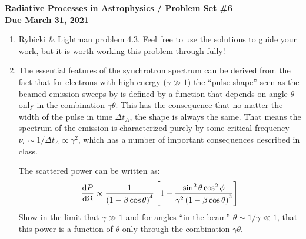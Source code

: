 \documentclass[11pt, preprint]{article}
\begin{document}
\begin{center}
  {\bf Radiative Processes in Astrophysics / Problem Set \#6 \\
    Due March 31, 2021}
\end{center}

\begin{enumerate}
\item Rybicki \& Lightman problem 4.3. Feel free to use the solutions
  to guide your work, but it is worth working this problem through
  fully!
\item The essential features of the synchrotron spectrum can be
  derived from the fact that for electrons with high energy ($\gamma
  \gg 1$) the ``pulse shape'' seen as the beamed emission sweeps by is
  defined by a function that depends on angle $\theta$ only in the
  combination $\gamma\theta$. This has the consequence that no matter
  the width of the pulse in time $\Delta t_A$, the shape is always the
  same. That means the spectrum of the emission is characterized
  purely by some critical frequency $\nu_c \sim 1 / \Delta t_A \propto
  \gamma^2$, which has a number of important consequences described in
  class.

  The scattered power can be written as:
  \begin{equation}
    \frac{{\rm d}P}{{\rm d}\Omega} \propto
    \frac{1}{\left(1-\beta\cos\theta\right)^4}
    \left[1 - \frac{\sin^2\theta \cos^2\phi}{\gamma^2 \left(1 -\beta
        \cos\theta\right)^2}\right]
  \end{equation}
  Show in the limit that $\gamma\gg 1$ and for angles ``in the beam''
  $\theta\sim 1/\gamma \ll 1$, that this power is a function of
  $\theta$ only through the combination $\gamma\theta$.
  
\end{enumerate}
\end{document}
